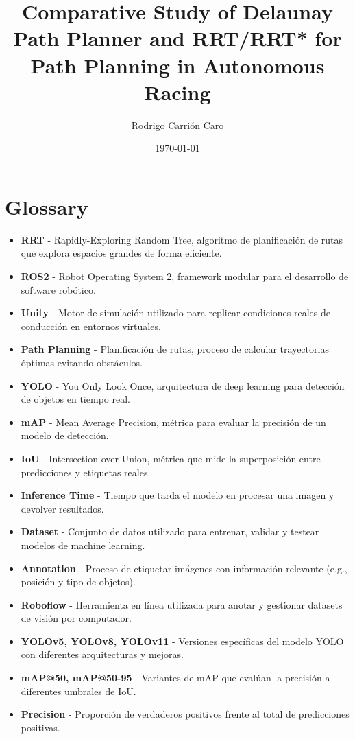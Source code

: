 \documentclass[a4paper,11pt]{report}
\title{\textbf{Comparative Study of Delaunay Path Planner and RRT/RRT* for Path Planning in Autonomous Racing}}
\author{Rodrigo Carri\'on Caro}
\date{\today}
\begin{document}
\maketitle
\tableofcontents
\newpage

\chapter*{Glossary}
\begin{itemize}
    \item \textbf{RRT} - Rapidly-Exploring Random Tree, algoritmo de planificación de rutas que explora espacios grandes de forma eficiente.
    \item \textbf{ROS2} - Robot Operating System 2, framework modular para el desarrollo de software robótico.
    \item \textbf{Unity} - Motor de simulación utilizado para replicar condiciones reales de conducción en entornos virtuales.
    \item \textbf{Path Planning} - Planificación de rutas, proceso de calcular trayectorias óptimas evitando obstáculos.
    \item \textbf{YOLO} - You Only Look Once, arquitectura de deep learning para detección de objetos en tiempo real.
    \item \textbf{mAP} - Mean Average Precision, métrica para evaluar la precisión de un modelo de detección.
    \item \textbf{IoU} - Intersection over Union, métrica que mide la superposición entre predicciones y etiquetas reales.
    \item \textbf{Inference Time} - Tiempo que tarda el modelo en procesar una imagen y devolver resultados.
    \item \textbf{Dataset} - Conjunto de datos utilizado para entrenar, validar y testear modelos de machine learning.
    \item \textbf{Annotation} - Proceso de etiquetar imágenes con información relevante (e.g., posición y tipo de objetos).
    \item \textbf{Roboflow} - Herramienta en línea utilizada para anotar y gestionar datasets de visión por computador.
    \item \textbf{YOLOv5, YOLOv8, YOLOv11} - Versiones específicas del modelo YOLO con diferentes arquitecturas y mejoras.
    \item \textbf{mAP@50, mAP@50-95} - Variantes de mAP que evalúan la precisión a diferentes umbrales de IoU.
    \item \textbf{Precision} - Proporción de verdaderos positivos frente al total de predicciones positivas.

\end{itemize}
\end{document}
